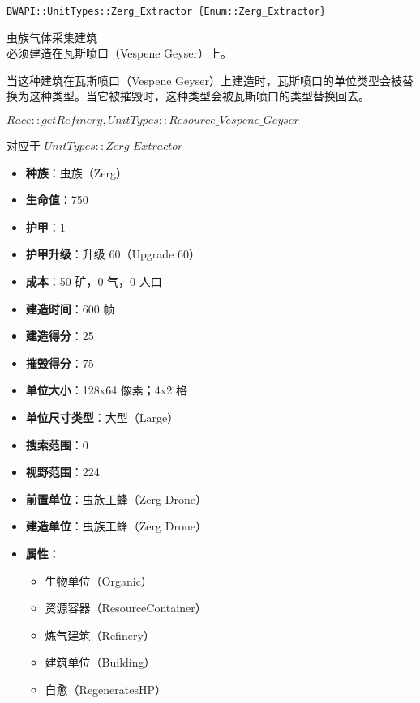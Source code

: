 \begin{tcolorbox}[colback=white, colframe=black!60!white, title=Zerg\_Extractor(), arc=0mm]
    \begin{verbatim}
BWAPI::UnitTypes::Zerg_Extractor {Enum::Zerg_Extractor}
    \end{verbatim}
    虫族气体采集建筑
    \\必须建造在瓦斯喷口（Vespene Geyser）上。
    \begin{note}
        当这种建筑在瓦斯喷口（Vespene Geyser）上建造时，瓦斯喷口的单位类型会被替换为这种类型。当它被摧毁时，这种类型会被瓦斯喷口的类型替换回去。
    \end{note}
    \begin{refer}
        $Race::getRefinery, UnitTypes::Resource\_Vespene\_Geyser$
    \end{refer}
    对应于  $UnitTypes::Zerg\_Extractor$ 
    \begin{itemize}
        \item \textbf{种族}：虫族（Zerg）
        \item \textbf{生命值}：750
        \item \textbf{护甲}：1
        \item \textbf{护甲升级}：升级 60（Upgrade 60）
        \item \textbf{成本}：50 矿，0 气，0 人口
        \item \textbf{建造时间}：600 帧
        \item \textbf{建造得分}：25
        \item \textbf{摧毁得分}：75
        \item \textbf{单位大小}：128x64 像素；4x2 格
        \item \textbf{单位尺寸类型}：大型（Large）
        \item \textbf{搜索范围}：0
        \item \textbf{视野范围}：224
        \item \textbf{前置单位}：虫族工蜂（Zerg Drone）
        \item \textbf{建造单位}：虫族工蜂（Zerg Drone）
        \item \textbf{属性}：
            \begin{itemize}
                \item 生物单位（Organic）
                \item 资源容器（ResourceContainer）
                \item 炼气建筑（Refinery）
                \item 建筑单位（Building）
                \item 自愈（RegeneratesHP）
            \end{itemize}
    \end{itemize}
\end{tcolorbox}

